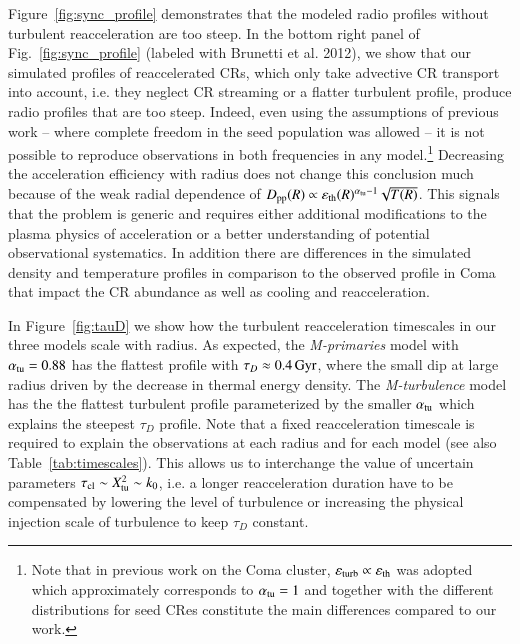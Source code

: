 \documentclass[fleqn,usenatbib,useAMS]{mnras}
\newcommand{\Mflatturb}{{\it M-turbulence}\xspace}
\newcommand{\Mprimary}{{\it M-primaries}\xspace}
\newcommand{\eps}{\varepsilon}
\begin{document}
Figure~\ref{fig:sync_profile} demonstrates that the modeled radio
profiles without turbulent reacceleration are too steep.  In the
bottom right panel of Fig.~\ref{fig:sync_profile} (labeled with
Brunetti et al. 2012), we show that our simulated profiles of
reaccelerated CRs, which only take advective CR transport into
account, i.e. they neglect CR streaming or a flatter turbulent
profile, produce radio profiles that are too steep. Indeed, even using
the assumptions of previous work -- where complete freedom in the seed
population was allowed -- it is not possible to reproduce observations
in both frequencies in any model.\footnote{Note that in previous work
  on the Coma cluster, $\eps_\rmn{turb} \propto \eps_\rmn{th}$ was
  adopted which approximately corresponds to $\alpha_{\mathrm{tu}}= 1$
  \citep{brunetti12} and together with the different distributions for
  seed CRes constitute the main differences compared to our work.}
Decreasing the acceleration efficiency with radius does not change
this conclusion much because of the weak radial dependence of
$D_\rmn{pp}(R)\propto \eps_\rmn{th}(R)^{\alpha_\rmn{tu}-1}
\sqrt{T(R)}$. This signals that the problem is generic and requires
either additional modifications to the plasma physics of acceleration
or a better understanding of potential observational systematics. In
addition there are differences in the simulated density and
temperature profiles in comparison to the observed profile in Coma
that impact the CR abundance as well as cooling and reacceleration.

In Figure~\ref{fig:tauD} we show how the turbulent reacceleration
timescales in our three models scale with radius. As expected, the
\Mprimary model with $\alpha_{\mathrm{tu}}=0.88$ has the flattest profile
with $\tau_D\approx0.4\,{\mathrm{Gyr}}$, where the small dip at large
radius driven by the decrease in thermal energy density. The
\Mflatturb model has the the flattest turbulent profile parameterized
by the smaller $\alpha_{\mathrm{tu}}$ which explains the steepest $\tau_D$
profile. Note that a fixed reacceleration timescale is required to
explain the observations at each radius and for each model (see also
Table~\ref{tab:timescales}). This allows us to interchange the value
of uncertain parameters $\tau_{\mathrm{cl}} \sim X_{\mathrm{tu}}^2 \sim k_0$,
i.e. a longer reacceleration duration have to be compensated by
lowering the level of turbulence or increasing the physical injection
scale of turbulence to keep $\tau_D$ constant.
\end{document}
